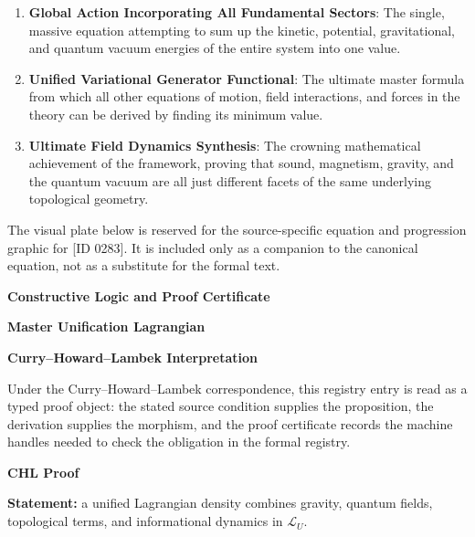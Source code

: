 \begin{enumerate}[leftmargin=1.6em,itemsep=6pt,topsep=4pt]
\item \textbf{Global Action Incorporating All Fundamental Sectors}: The single, massive equation attempting to sum up the kinetic, potential, gravitational, and quantum vacuum energies of the entire system into one value.
\item \textbf{Unified Variational Generator Functional}: The ultimate master formula from which all other equations of motion, field interactions, and forces in the theory can be derived by finding its minimum value.
\item \textbf{Ultimate Field Dynamics Synthesis}: The crowning mathematical achievement of the framework, proving that sound, magnetism, gravity, and the quantum vacuum are all just different facets of the same underlying topological geometry.
\end{enumerate}

\begingroup\footnotesize\sloppy
The visual plate below is reserved for the source-specific equation and progression graphic for [ID 0283]. It is included only as a companion to the canonical equation, not as a substitute for the formal text.
\par\endgroup
\ifTZPDarkEdition
{}
\fi

\clearpage
\begingroup\tzpsupportsetup
\noindent\textbf{\fontsize{10.8pt}{12.8pt}\selectfont [ID 0283] Constructive Logic and Proof Certificate}\par
\noindent\textbf{\fontsize{10pt}{12pt}\selectfont Master Unification Lagrangian}\par
\vspace{0.45em}
\begingroup
\footnotesize
\setlength{\parskip}{0.22em}
\setlength{\parindent}{0pt}
\noindent\textbf{Curry--Howard--Lambek Interpretation}\par
Under the Curry--Howard--Lambek correspondence, this registry entry is read as a typed proof
object: the stated source condition supplies the proposition, the derivation supplies the
morphism, and the proof certificate records the machine handles needed to check the obligation
in the formal registry.

\vspace{0.45em}
\noindent\textbf{CHL Proof}\par
\textbf{Statement:} a unified Lagrangian density combines gravity, quantum fields, topological terms, and informational dynamics in \(\mathcal{L}_U\).

